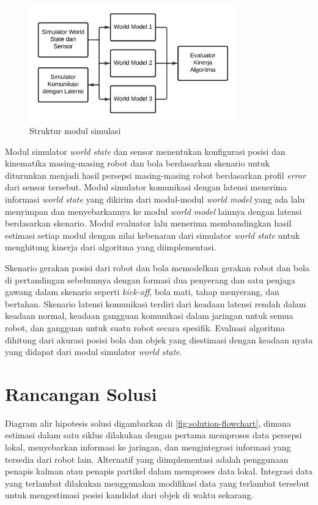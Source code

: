 \begin{figure}[h]
    \centering
    \includegraphics[width=0.8\textwidth]{resources/simulation-structure.png}
    \caption{Struktur modul simulasi}
    \label{fig:simulation-structure}
\end{figure}

Modul simulator \textit{world state} dan sensor menentukan konfigurasi posisi dan kinematika masing-masing robot dan bola berdasarkan skenario untuk diturunkan menjadi hasil persepsi masing-masing robot berdasarkan profil \textit{error} dari sensor tersebut. Modul simulator komunikasi dengan latensi menerima informasi \textit{world state} yang dikirim dari modul-modul \textit{world model} yang ada lalu menyimpan dan menyebarkannya ke modul \textit{world model} lainnya dengan latensi berdasarkan skenario. Modul evaluator lalu menerima membandingkan hasil estimasi setiap modul dengan nilai kebenaran dari simulator \textit{world state} untuk menghitung kinerja dari algoritma yang diimplementasi.

Skenario gerakan posisi dari robot dan bola memodelkan gerakan robot dan bola di pertandingan sebelumnya dengan formasi dua penyerang dan satu penjaga gawang dalam skenario seperti \textit{kick-off}, bola mati, tahap menyerang, dan bertahan. Skenario latensi komunikasi terdiri dari keadaan latensi rendah dalam keadaan normal, keadaan gangguan komunikasi dalam jaringan untuk semua robot, dan gangguan untuk suatu robot secara spesifik. Evaluasi algoritma dihitung dari akurasi posisi bola dan objek yang diestimasi dengan keadaan nyata yang didapat dari modul simulator \textit{world state}.

\section{Rancangan Solusi}

Diagram alir hipotesis solusi digambarkan di \ref{fig:solution-flowchart}, dimana estimasi dalam satu siklus dilakukan dengan pertama memproses data persepsi lokal, menyebarkan informasi ke jaringan, dan mengintegrasi informasi yang tersedia dari robot lain. Alternatif yang diimplementasi adalah penggunaan penapis kalman atau penapis partikel dalam memproses data lokal. Integrasi data yang terlambat dilakukan menggunakan modifikasi data yang terlambat tersebut untuk mengestimasi posisi kandidat dari objek di waktu sekarang.

